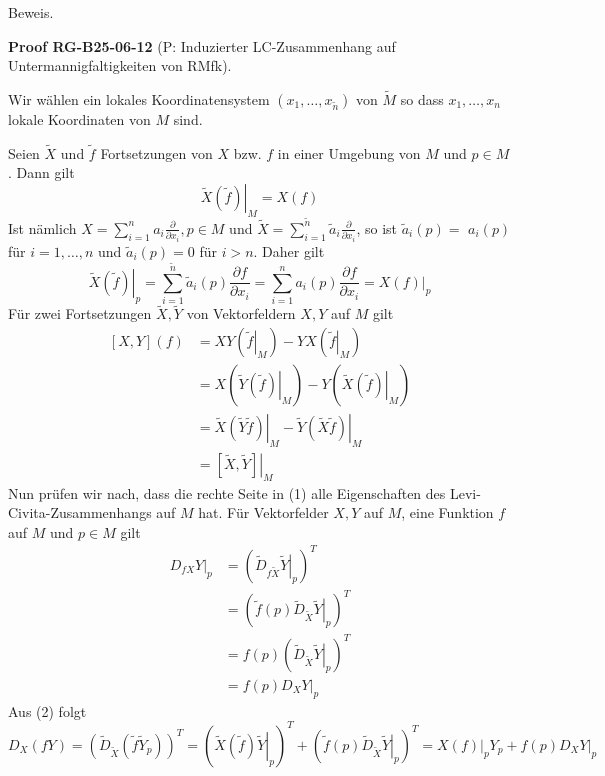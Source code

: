\documentclass[10pt, letterpaper]{article}
\newcommand{\CustomHeading}[3]{%
  \par\medskip\noindent%
  \textbf{#1 #2} \textnormal{(#3)}.\enskip%
}
\newenvironment{PROOF}[2]{\begin{unitbox}\CustomHeading{Proof}{#1}{#2}}{\end{unitbox}}
\begin{document}
Beweis. 


\begin{PROOF}{RG-B25-06-12}{P: Induzierter LC-Zusammenhang auf Untermannigfaltigkeiten von RMfk}
Wir wählen ein lokales Koordinatensystem $\left(x_{1}, \ldots, x_{\tilde{n}}\right)$ von $\tilde{M}$ so dass $x_{1}, \ldots, x_{n}$ lokale Koordinaten von $M$ sind.

Seien $\tilde{X}$ und $\tilde{f}$ Fortsetzungen von $X$ bzw. $f$ in einer Umgebung von $M$ und $p \in M$. Dann gilt
\begin{equation*}
\left.\tilde{X}(\tilde{f})\right|_{M}=X(f) \tag{2}
\end{equation*}
Ist nämlich $X=\sum_{i=1}^{n} a_{i} \frac{\partial}{\partial x_{i}}, p \in M$ und $\tilde{X}=\sum_{i=1}^{\tilde{n}} \tilde{a}_{i} \frac{\partial}{\partial x_{i}}$, so ist $\tilde{a}_{i}(p)=$ $a_{i}(p)$ für $i=1, \ldots, n$ und $\tilde{a}_{i}(p)=0$ für $i>n$. Daher gilt
$$
\left.\tilde{X}(\tilde{f})\right|_{p}=\sum_{i=1}^{\tilde{n}} \tilde{a}_{i}(p) \frac{\partial f}{\partial x_{i}}=\sum_{i=1}^{n} a_{i}(p) \frac{\partial f}{\partial x_{i}}=\left.X(f)\right|_{p}
$$
Für zwei Fortsetzungen $\tilde{X}, \tilde{Y}$ von Vektorfeldern $X, Y$ auf $M$ gilt
\begin{align*}
{[X, Y](f) } & =X Y\left(\left.\tilde{f}\right|_{M}\right)-Y X\left(\left.\tilde{f}\right|_{M}\right) \\
& =X\left(\left.\tilde{Y}(\tilde{f})\right|_{M}\right)-Y\left(\left.\tilde{X}(\tilde{f})\right|_{M}\right) \\
& =\left.\tilde{X}(\tilde{Y} \tilde{f})\right|_{M}-\left.\tilde{Y}(\tilde{X} \tilde{f})\right|_{M} \\
& =\left.[\tilde{X}, \tilde{Y}]\right|_{M} \tag{3}
\end{align*}
Nun prüfen wir nach, dass die rechte Seite in (1) alle Eigenschaften des Levi-Civita-Zusammenhangs auf $M$ hat. Für Vektorfelder $X, Y$ auf $M$, eine Funktion $f$ auf $M$ und $p \in M$ gilt
\[
\begin{aligned}
\left. D_{f X} Y \right|_{p} 
&= \left( \left. \tilde{D}_{f \tilde{X}} \tilde{Y} \right|_{p} \right)^T \\
&= \left( \left. \tilde{f}(p) \tilde{D}_{\tilde{X}} \tilde{Y} \right|_{p} \right)^T \\
&= f(p) \left( \left. \tilde{D}_{\tilde{X}} \tilde{Y} \right|_{p} \right)^T \\
&= \left. f(p) D_X Y \right|_{p}
\end{aligned}
\]
Aus (2) folgt
$$
D_{X}(f Y)=\left(\tilde{D}_{\tilde{X}}\left(\tilde{f} \tilde{Y}_{p}\right)\right)^{T}=\left(\left.\tilde{X}(\tilde{f}) \tilde{Y}\right|_{p}\right)^{T}+\left(\left.\tilde{f}(p) \tilde{D}_{\tilde{X}} \tilde{Y}\right|_{p}\right)^{T}=\left.X(f)\right|_{p} Y_{p}+\left.f(p) D_{X} Y\right|_{p}
$$
\end{PROOF}
\end{document}
